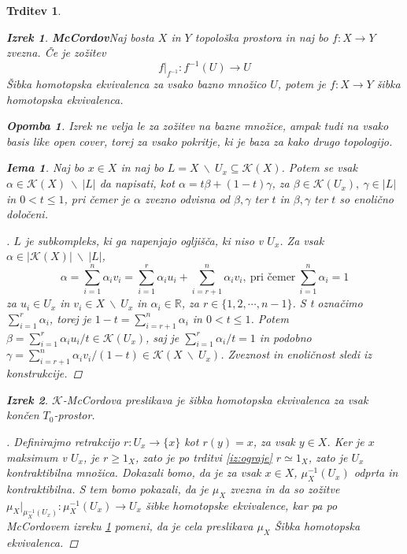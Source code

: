 \documentclass[a4paper,12pt]{article}
\DeclareRobustCommand{\k}{
    \mathcal{K}
}
\theoremstyle{definition}
\theoremstyle{plain}
\newtheorem{izrek}{Izrek}
\theoremstyle{definition}
\theoremstyle{plain}
\newtheorem{trditev}{Trditev}
\theoremstyle{plain}
\theoremstyle{plain}
\newtheorem{opomba}{Opomba}
\theoremstyle{plain}
\newtheorem{lema}{Iema}
\newenvironment{dokaz}{\begin{proof}[\bfseries\upshape\proofname]}{\end{proof}}
\begin{document}
\begin{trditev}
\begin{izrek}{\textbf{McCordov}}\label{iz:mccord}
    Naj bosta $X$ in $Y$ topološka prostora in naj bo $f:X\rightarrow Y$ zvezna. Če je zožitev
    $$
    f|_{f^{-1}}:f^{-1}(U)\rightarrow U
    $$
    Šibka homotopska ekvivalenca za vsako bazno množico $U$, potem je $f:X\rightarrow Y$  šibka homotopska ekvivalenca.
\end{izrek}

\begin{opomba}
    Izrek ne velja le za zožitev na bazne množice, ampak tudi na vsako \textit{basis like open cover}, torej za vsako pokritje, ki je baza za kako drugo topologijo.
\end{opomba}



\begin{lema}\label{lem:sibka}
    Naj bo $x\in X$ in naj bo $L=X\ \backslash \
    U_x\subseteq \mathcal{K}(X)$. Potem se vsak $\alpha \in \k(X)\ \backslash \ |L|$ da napisati, kot $\alpha = t\beta + (1-t)\gamma$, za $\beta \in \k(U_x), \ \gamma \in |L|$ in $0<t\leq 1$, pri čemer je $\alpha$ zvezno odvisna od $\beta, \gamma$ ter $t$ in $\beta, \gamma$ ter $t$ so enolično določeni.
\end{lema}
\begin{dokaz}
    $L$ je subkompleks, ki ga napenjajo ogljišča, ki niso v $U_x$. Za vsak $\alpha \in |\k(X)|\ \backslash \ |L|$, 
    $$\alpha = \sum_{i=1}^{n} \alpha_i v_i 
    = \sum_{i=1}^{r} \alpha_i u_i + \sum_{i=r+1}^{n}\alpha_i v_i,\ \text{pri čemer}\ \sum_{i=1}^{n} \alpha_i=1
    $$
    za $u_i \in U_x$ in $v_i \in X \ \backslash \ U_x$ in $\alpha_i \in \mathbb{R}$, za $r\in \{1,2, \cdots, n-1\}$. S t označimo $\sum_{i=1}^{r} \alpha_i$, torej je $1-t=\sum_{i=r+1}^{n} \alpha_i$ in $0<t\leq 1$. Potem $\beta =\sum_{i=1}^{r} \alpha_i u_i/t \in \k(U_x)$, saj je $\sum_{i=1}^{r} \alpha_i/t=1$ in podobno $\gamma=\sum_{i=r+1}^{n} 
    \alpha_i v_i/(1-t) \in \k(X \ \backslash \ U_x)$. Zveznost in enoličnost sledi iz konstrukcije.

\end{dokaz}

\begin{izrek}
    $\mathcal{K}$-\textit{McCordova} preslikava je šibka homotopska 
    ekvivalenca za vsak končen $T_0$-prostor.
\end{izrek}

\begin{dokaz}
    Definirajmo retrakcijo $r:U_x\rightarrow \{x\}$ kot 
    $r(y)=x$, za vsak $y\in X$. Ker je $x$ maksimum v 
    $U_x$, je $r\geq 1_X$, zato je po trditvi 
    \ref{iz:ograje} $r\simeq 1_X$, zato je $U_x$ 
    kontraktibilna množica. Dokazali bomo, da je za vsak 
    $x\in X$, $\mu_X^{-1}(U_x)$ odprta in kontraktibilna. S 
    tem bomo pokazali, da je $\mu_X$ zvezna in da so 
    zožitve $\mu_X|_{\mu_X^{-1}(U_x)}:\mu_X^{-1}(U_x)\rightarrow 
    U_x$ šibke homotopske ekvivalence, kar pa po McCordovem izreku \ref*{iz:mccord}
    pomeni, da je cela preslikava $\mu_X$ Šibka homotopska ekvivalenca.


\end{dokaz}
\end{trditev}
\end{document}
